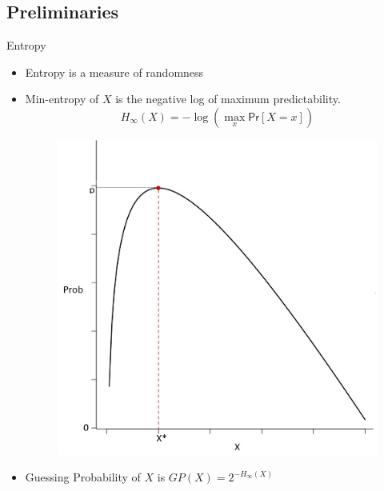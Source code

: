 \documentclass{beamer}
\begin{document}
\subsection{Preliminaries}

\begin{frame}{Entropy}
	\begin{itemize}
		\setlength\itemsep{1em}
		\item Entropy is a measure of randomness
		\item Min-entropy of $X$ is the negative log of maximum predictability.
		\begin{equation*}
		    H_{\infty}(X) = - \log \left( \max\limits_{x} \mathsf{Pr} \left[ X=x \right] \right)
		\end{equation*}
		\begin{figure}
		    \includegraphics[scale=0.2]{min_entropy}
		\end{figure}
		\item Guessing Probability of $X$ is $GP(X)=2^{-H_{\infty}(X)}$
	\end{itemize}
\end{frame}

\end{document}
